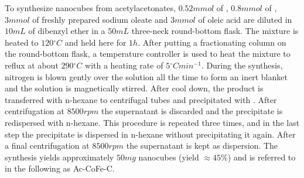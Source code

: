 \documentclass[\main/dresen_thesis.tex]{subfiles}
\begin{document}
    To synthesize nanocubes from acetylacetonates, $0.52 \unit{mmol}$ of , $0.8 \unit{mmol}$ of , $3 \unit{mmol}$ of freshly prepared sodium oleate and $3 \unit{mmol}$ of oleic acid are diluted in $10 \unit{mL}$ of dibenzyl ether in a $50 \unit{mL}$ three-neck round-bottom flask.
    The mixture is heated to $120 \unit{^\circ C}$ and held here for $1 \unit{h}$.
    After putting a fractionating column on the round-bottom flask, a temperature controller is used to heat the mixture to reflux at about $290 \unit{^\circ C}$ with a heating rate of $5 \unit{^\circ C min^{-1}}$.
    During the synthesis, nitrogen is blown gently over the solution all the time to form an inert blanket and the solution is magnetically stirred.
    After cool down, the product is transferred with n-hexane to centrifugal tubes and precipitated with .
    After centrifugation at $8500 \unit{rpm}$ the supernatant is discarded and the precipitate is redispersed with n-hexane.
    This procedure is repeated three times, and in the last step the precipitate is dispersed in n-hexane without precipitating it again.
    After a final centrifugation at $8500 \unit{rpm}$ the supernatant is kept as dispersion.
    The synthesis yields approximately $50 \unit{mg}$ nanocubes (yield $\approx 45 \%$) and is referred to in the following as Ac-CoFe-C.
\end{document}
